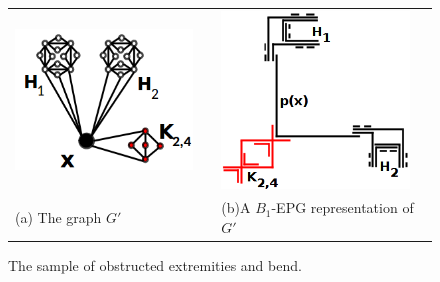 \begin{figure}[h]
  \centering
  \begin{tabular}{p{6cm} p{1cm} p{6cm}}
     \includegraphics[width=5cm, center]{./img/grafoDobraExtremidadeObstruida.png} &  &\includegraphics[width=5cm, center]{./img/extremidadeDobraObstruida2.png}  \\%
    \footnotesize \centering (a) The graph $G'$& & \footnotesize \centering (b)A $B_1$-EPG representation of $G'$%
  \end{tabular}
 \caption{The sample of  obstructed extremities and bend.}\label{fig:extremidadeDobraObstruida}
\end{figure}